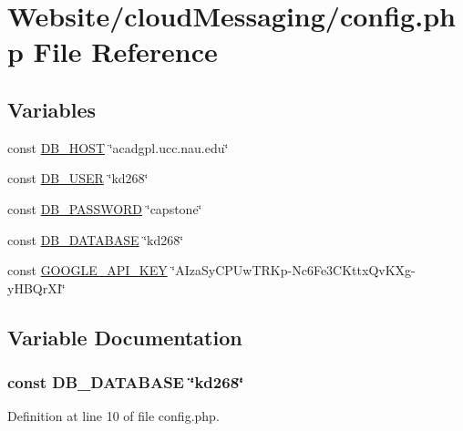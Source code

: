 \hypertarget{config_8php}{\section{Website/cloud\-Messaging/config.php File Reference}
\label{config_8php}
}
\subsection*{Variables}
\begin{DoxyCompactItemize}
\item 
const \hyperlink{config_8php_a293363d7988627f671958e2d908c202a}{D\-B\-\_\-\-H\-O\-S\-T} \char`\"{}acadgpl.\-ucc.\-nau.\-edu\char`\"{}
\item 
const \hyperlink{config_8php_a1d1d99f8e08f387d84fe9848f3357156}{D\-B\-\_\-\-U\-S\-E\-R} \char`\"{}kd268\char`\"{}
\item 
const \hyperlink{config_8php_a4dca144fafcc7bd3f71cb5778afcdd13}{D\-B\-\_\-\-P\-A\-S\-S\-W\-O\-R\-D} \char`\"{}capstone\char`\"{}
\item 
const \hyperlink{config_8php_a4798f8ff41893eb12308c2b638b8becf}{D\-B\-\_\-\-D\-A\-T\-A\-B\-A\-S\-E} \char`\"{}kd268\char`\"{}
\item 
const \hyperlink{config_8php_a790fe630024963ffd7343444ad986bc7}{G\-O\-O\-G\-L\-E\-\_\-\-A\-P\-I\-\_\-\-K\-E\-Y} \char`\"{}A\-Iza\-Sy\-C\-P\-Uw\-T\-R\-Kp-\/Nc6\-Fe3\-C\-Kttx\-Qv\-K\-Xg-\/y\-H\-B\-Qr\-X\-I\char`\"{}
\end{DoxyCompactItemize}


\subsection{Variable Documentation}
\hypertarget{config_8php_a4798f8ff41893eb12308c2b638b8becf}{
\subsubsection[{D\-B\-\_\-\-D\-A\-T\-A\-B\-A\-S\-E}]{\setlength{\rightskip}{0pt plus 5cm}const D\-B\-\_\-\-D\-A\-T\-A\-B\-A\-S\-E \char`\"{}kd268\char`\"{}}}\label{config_8php_a4798f8ff41893eb12308c2b638b8becf}


Definition at line 10 of file config.\-php.

